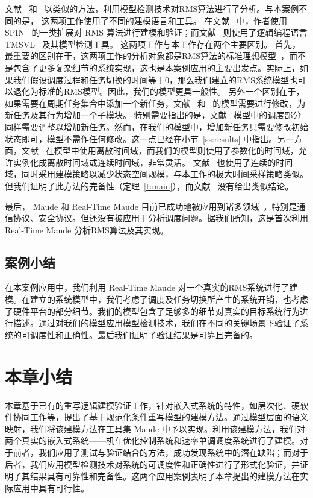 文献~ 和~ 以类似的方法，利用模型检测技术对RMS算法进行了分析。与本案例不同的是，
这两项工作使用了不同的建模语言和工具。
在文献~ 中，作者使用 SPIN~\cite{DBLP:journals/tse/Holzmann97} 的一类扩展对 RMS 算法进行建模和验证；而文献~ 则使用了逻辑编程语言 TMSVL~\cite{DBLP:conf/icfem/HanDW12} 及其模型检测工具。
这两项工作与本工作存在两个主要区别。
首先，最重要的区别在于，这两项工作的分析对象都是RMS算法的标准理想模型~\cite{DBLP:journals/jacm/LiuL73}，而不是包含了更多复杂细节的系统实现，这也是本案例应用的主要出发点。实际上，如果我们假设调度过程和任务切换的时间等于0，那么我们建立的RMS系统模型也可以退化为标准的RMS模型。因此，我们的模型更具一般性。
另外一个区别在于，如果需要在周期任务集合中添加一个新任务，文献~ 和~ 的模型需要进行修改，为新任务及其行为增加一个子模块。
特别需要指出的是，文献~ 模型中的调度部分同样需要调整以增加新任务。然而，在我们的模型中，增加新任务只需要修改初始状态即可，模型不需作任何修改。这一点已经在小节~\ref{ss:results} 中指出。另一方面，文献~ 在模型中使用离散时间域，而我们的模型则使用了参数化的时间域，允许实例化成离散时间域或连续时间域，非常灵活。 文献~ 也使用了连续的时间域，同时采用建模策略以减少状态空间规模，与本工作的极大时间采样策略类似。但我们证明了此方法的完备性（定理~\ref{t:main}），而文献~ 没有给出类似结论。

最后， Maude 和 Real-Time Maude 目前已成功地被应用到诸多领域~\cite{DBLP:journals/jlp/Meseguer12}，特别是通信协议、安全协议。但还没有被应用于分析调度问题。据我们所知，这是首次利用 Real-Time Maude 分析RMS算法及其实现。


\subsection{案例小结}
\label{s:conclusion}
在本案例应用中，我们利用 Real-Time Maude 对一个真实的RMS系统进行了建模。在建立的系统模型中，我们考虑了调度及任务切换所产生的系统开销，也考虑了硬件平台的部分细节。我们的模型包含了足够多的细节对真实的目标系统行为进行描述。通过对我们的模型应用模型检测技术，我们在不同的关键场景下验证了系统的可调度性和正确性。最后我们证明了验证结果是可靠且完备的。 


\section{本章小结}

本章基于已有的重写逻辑建模验证工作，针对嵌入式系统的特性，如层次化、硬软件协同工作等，提出了基于规范化条件重写模型的建模方法。通过模型层面的语义映射，我们将该建模方法在工具集 Maude 中予以实现。利用该建模方法，我们对两个真实的嵌入式系统——机车优化控制系统和速率单调调度系统进行了建模。对于前者，我们应用了测试与验证结合的方法，成功发现系统中的潜在缺陷；而对于后者，我们应用模型检测技术对系统的可调度性和正确性进行了形式化验证，并证明了其结果具有可靠性和完备性。这两个应用案例表明了本章提出的建模方法在实际应用中具有可行性。
